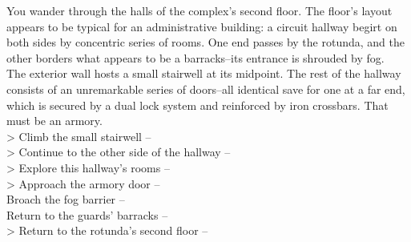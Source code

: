 You wander through the halls of the complex’s second floor. The floor's layout appears to be typical for an administrative building: a circuit hallway begirt on both sides by concentric series of rooms. One end passes by the rotunda, and the other borders what appears to be a barracks--its entrance is shrouded by fog.\\

The exterior wall hosts a small stairwell at its midpoint. The rest of the hallway consists of an unremarkable series of doors--all identical save for one at a far end, which is secured by a dual lock system and reinforced by iron crossbars. That must be an armory.\\

> Climb the small stairwell -- \\
> Continue to the other side of the hallway -- \\
> Explore this hallway's rooms -- \\
> Approach the armory door -- \\
 Broach the fog barrier -- \\
 Return to the guards' barracks -- \\
> Return to the rotunda’s second floor -- 